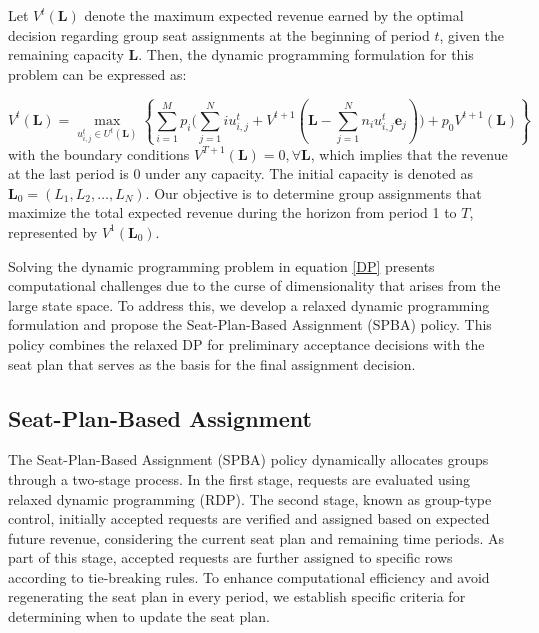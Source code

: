 Let $V^{t}(\mathbf{L})$ denote the maximum expected revenue earned by the optimal decision regarding group seat assignments at the beginning of period $t$, given the remaining capacity $\mathbf{L}$. Then, the dynamic programming formulation for this problem can be expressed as:

\begin{equation}\label{DP}
V^{t}(\mathbf{L}) = \max_{u_{i,j}^{t} \in U^{t}(\mathbf{L})}\left\{\sum_{i=1}^{M} p_i \bigl( \sum_{j=1}^{N} i u_{i,j}^{t} + V^{t+1}(\mathbf{L} - \sum_{j=1}^{N} n_i u_{i,j}^{t}\mathbf{e}_j)\bigr) + p_0 V^{t+1}(\mathbf{L})\right\}
\end{equation}
with the boundary conditions $V^{T+1}(\mathbf{L}) = 0, \forall \mathbf{L}$, which implies that the revenue at the last period is 0 under any capacity. The initial capacity is denoted as $\mathbf{L}_{0} = (L_1, L_2, \ldots, L_N)$. Our objective is to determine group assignments that maximize the total expected revenue during the horizon from period 1 to $T$, represented by $V^{1}(\mathbf{L}_{0})$.


Solving the dynamic programming problem in equation \eqref{DP} presents computational challenges due to the curse of dimensionality that arises from the large state space. To address this, we develop a relaxed dynamic programming formulation and propose the Seat-Plan-Based Assignment (SPBA) policy. This policy combines the relaxed DP for preliminary acceptance decisions with the seat plan that serves as the basis for the final assignment decision.



\subsection{Seat-Plan-Based Assignment}
The Seat-Plan-Based Assignment (SPBA) policy dynamically allocates groups through a two-stage process. In the first stage, requests are evaluated using relaxed dynamic programming (RDP). The second stage, known as group-type control, initially accepted requests are verified and assigned based on expected future revenue, considering the current seat plan and remaining time periods. As part of this stage, accepted requests are further assigned to specific rows according to tie-breaking rules. To enhance computational efficiency and avoid regenerating the seat plan in every period, we establish specific criteria for determining when to update the seat plan.

